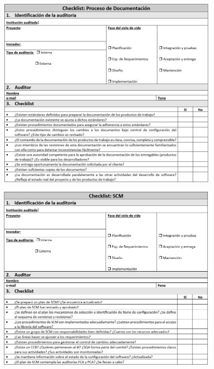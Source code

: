 \begin{figure}[H]
\centering
\includegraphics[width=1\textwidth]{figures/anexos/5-2.PNG}
\end{figure}

\begin{figure}[H]
\centering
\includegraphics[width=1\textwidth]{figures/anexos/5-3.PNG}
\end{figure}

